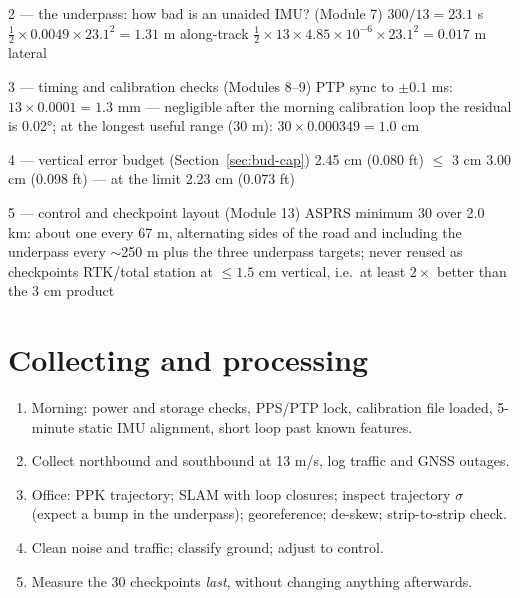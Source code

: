 \begin{worked}{2 --- the underpass: how bad is an unaided IMU? (Module 7)}
 $300/13=23.1$ s
 $\tfrac12\times0.0049\times23.1^2=1.31$ m along-track
 $\tfrac12\times13\times4.85\times10^{-6}\times23.1^2=0.017$ m lateral
\end{worked}

\begin{worked}{3 --- timing and calibration checks (Modules 8--9)}
 PTP sync to $\pm0.1$ ms: $13\times0.0001=1.3$ mm --- negligible
 after the morning calibration loop the residual is 0.02°; at the longest useful range (30 m): $30\times0.000349=1.0$ cm
\end{worked}

\begin{worked}{4 --- vertical error budget (Section~\ref{sec:bud-cap})}
 2.45 cm (0.080 ft) $\le$ 3 cm \checkmark
{} 3.00 cm (0.098 ft) --- at the limit \texttimes
{} 2.23 cm (0.073 ft) \checkmark
{}
\end{worked}

\begin{worked}{5 --- control and checkpoint layout (Module 13)}
 ASPRS minimum 30 over 2.0 km: about one every 67 m, alternating sides of the road and including the underpass
 every $\sim$250 m plus the three underpass targets; never reused as checkpoints
 RTK/total station at $\le1.5$ cm vertical, i.e.\ at least $2\times$ better than the 3 cm product
\end{worked}

\section{Collecting and processing}
\begin{enumerate}
\item Morning: power and storage checks, PPS/PTP lock, calibration file loaded, 5-minute static IMU alignment, short loop past known features.
\item Collect northbound and southbound at 13 m/s, log traffic and GNSS outages.
\item Office: PPK trajectory; SLAM with loop closures; inspect trajectory $\sigma$ (expect a bump in the underpass); georeference; de-skew; strip-to-strip check.
\item Clean noise and traffic; classify ground; adjust to control.
\item Measure the 30 checkpoints \emph{last}, without changing anything afterwards.
\end{enumerate}


